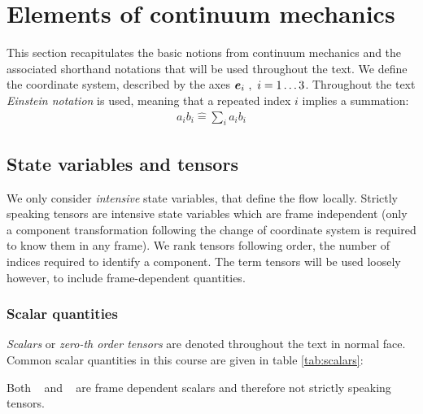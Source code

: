 \section{Elements of continuum mechanics}
\label{sec:principles:continuumMechanics}

This section recapitulates the basic notions from continuum mechanics
and the associated shorthand notations that will be used throughout
the text. We define the coordinate system, described by the axes
$\boldsymbol e_{i}~,~i=1 \ldots 3$. Throughout the text \emph{Einstein
  notation} is used, meaning that a repeated index $i$ implies a
summation:
\begin{align*}
  a_i b_i \hat = \sum_i a_i b_i 
\end{align*}

\subsection{State variables and tensors}
\label{subsec:principles:tensors}

We only consider \emph{intensive} state variables, \ie that define the
flow locally. Strictly speaking tensors are intensive state variables
which are frame independent (\ie only a component transformation
following the change of coordinate system is required to know them in
any frame). We rank tensors following order, \ie the number of indices
required to identify a component. The term tensors will be used
loosely however, to include frame-dependent quantities.

\subsubsection{Scalar quantities} 

\emph{Scalars} or \emph{zero-th order tensors} are denoted throughout
the text in normal face. Common scalar quantities in this course are
given in table \ref{tab:scalars}:
\begin{table}[H]
  \caption{Common scalar quantities in fluid mechanics}
  \label{tab:scalars}
\end{table}
\noindent
Both \tEnth~ and \tEner~ are frame dependent scalars and therefore not
strictly speaking tensors.
  
